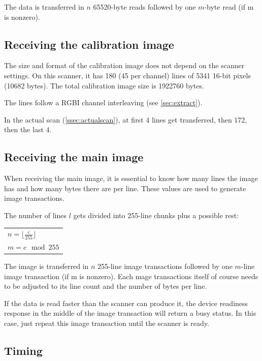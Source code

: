 \documentclass{article}
\begin{document}
The data is transferred in $n$ 65520-byte reads followed by one $m$-byte
read (if m is nonzero).

\subsection{Receiving the calibration image}
\label{ssec:rcv_calibimage}

The size and format of the calibration image does not depend on the scanner settings.
On this scanner, it has 180 (45 per channel) lines of 5341 16-bit pixels (10682 bytes).
The total calibration image size is 1922760 bytes.

The lines follow a RGBI channel interleaving (see \autoref{sec:extract}).

In the actual scan (\autoref{ssec:actualscan}), at first 4 lines get transferred, then 172, then the last 4.

\subsection{Receiving the main image}
\label{ssec:rcv_mainimage}

When receiving the main image, it is essential to know how many lines the image
has and how many bytes there are per line. These values are used to generate image transactions.

The number of lines $l$ gets divided into 255-line chunks plus a possible rest:

\begin{center}
\begin{tabular}{l}
$n = \lfloor \frac{c}{255} \rfloor $ \\
$m = c \mod 255$ \\
\end{tabular}
\end{center}

The image is transferred in $n$ 255-line image transactions followed by one $m$-line
image transaction (if m is nonzero). Each mage transactions itself of course needs
to be adjusted to its line count and the number of bytes per line.

If the data is read faster than the scanner can produce it, the device readiness
response in the middle of the image transaction will return a busy status. In this case,
just repeat this image transaction until the scanner is ready.

\subsection{Timing}
\end{document}
